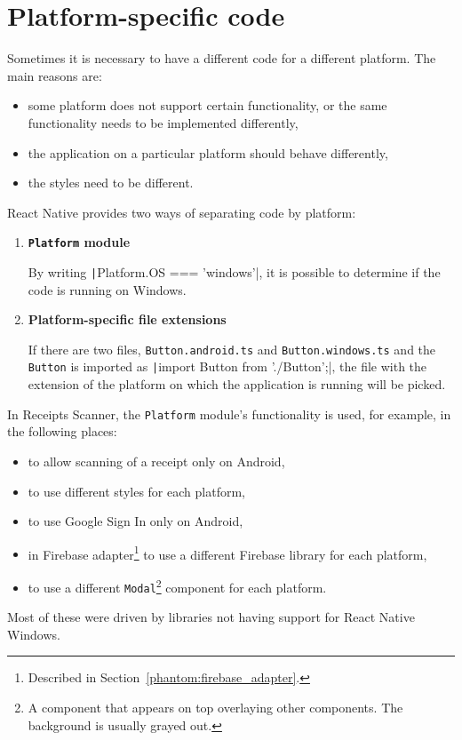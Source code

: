\documentclass[
  printed, %
  table,   %
  oneside, %
  lof,     %
  lot,     %
]{fithesis3}
\newcommand{\code}[1]{\texttt|#1|} %
\begin{document}
\section{Platform-specific code}
\label{sec:platform_specific_code}
Sometimes it is necessary to have a different code for a different platform. The main reasons are:
\begin{itemize}
\item some platform does not support certain functionality, or the same functionality needs to be implemented differently,
\item the application on a particular platform should behave differently,
\item the styles need to be different.
\end{itemize}

React Native provides two ways of separating code by platform:
\begin{enumerate}
\item \textbf{\texttt{Platform} module}
    
    By writing \code{Platform.OS === 'windows'}, it is possible to determine if the code is running on Windows.
\item \textbf{Platform-specific file extensions}

    If there are two files, \texttt{Button.android.ts} and \texttt{Button.windows.ts} and the \texttt{Button} is imported as \code{import Button from './Button';}‚ the file with the extension of the platform on which the application is running will be picked.
\end{enumerate}

In Receipts Scanner, the \texttt{Platform} module's functionality is used, for example, in the following places:
\begin{itemize}
    \item to allow scanning of a receipt only on Android,
    \item to use different styles for each platform,
    \item to use Google Sign In only on Android,
    \item in Firebase adapter\footnote{Described in Section~\ref{phantom:firebase_adapter}.} to use a different Firebase library for each platform,
    \item to use a different \texttt{Modal}\footnote{A component that appears on top overlaying other components. The background is usually grayed out.} component for each platform.
\end{itemize}
Most of these were driven by libraries not having support for React Native Windows.
\end{document}
